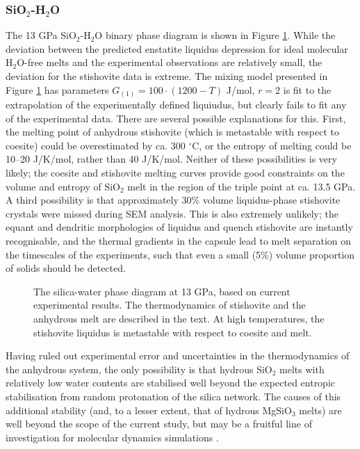 \documentclass[review]{elsarticle}
\begin{document}
\subsubsection{SiO$_2$-H$_2$O}
The 13 GPa SiO$_2$-H$_2$O binary phase diagram is shown in Figure \ref{fig:SH}. While the deviation between the predicted enstatite liquidus depression for ideal molecular H$_2$O-free melts and the experimental observations are relatively small, the deviation for the stishovite data is extreme. The mixing model presented in Figure \ref{fig:SH} has parameters $G_{(1)} = 100 \cdot (1200-T)$ J/mol, $r=2$ is fit to the extrapolation of the experimentally defined liquiudus, but clearly fails to fit any of the experimental data. There are several possible explanations for this. First, the melting point of anhydrous stishovite (which is metastable with respect to coesite) could be overestimated by ca. 300 $^{\circ}$C, or the entropy of melting could be 10--20 J/K/mol, rather than 40 J/K/mol. Neither of these possibilities is very likely; the coesite and stishovite melting curves provide good constraints on the volume and entropy of SiO$_2$ melt in the region of the triple point at ca. 13.5 GPa. A third possibility is that approximately 30\% volume liquidus-phase stishovite crystals were missed during SEM analysis. This is also extremely unlikely; the equant and dendritic morphologies of liquidus and quench stishovite are instantly recognisable, and the thermal gradients in the capsule lead to melt separation on the timescales of the experiments, such that even a small (5\%) volume proportion of solids should be detected.

\begin{figure}[ht!]
  \centering
      \caption{The silica-water phase diagram at 13 GPa, based on current experimental results. The thermodynamics of stishovite and the anhydrous melt are described in the text. At high temperatures, the stishovite liquidus is metastable with respect to coesite and melt.}
  \label{fig:SH}
\end{figure}

Having ruled out experimental error and uncertainties in the thermodynamics of the anhydrous system, the only possibility is that hydrous SiO$_2$ melts with relatively low water contents are stabilised well beyond the expected entropic stabilisation from random protonation of the silica network. The causes of this additional stability (and, to a lesser extent, that of hydrous MgSiO$_3$ melts) are well beyond the scope of the current study, but may be a fruitful line of investigation for molecular dynamics simulations \citep[e.g.][]{KS2010}.
\end{document}
